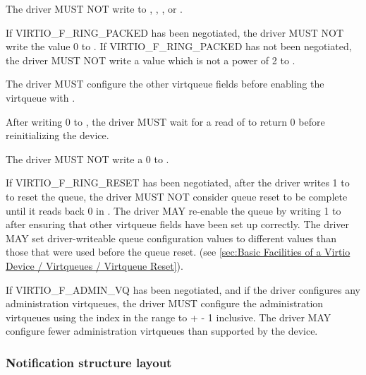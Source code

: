 
The driver MUST NOT write to , ,
,  or
.

If VIRTIO_F_RING_PACKED has been negotiated,
the driver MUST NOT write the value 0 to .
If VIRTIO_F_RING_PACKED has not been negotiated,
the driver MUST NOT write a value which is not a power of 2 to .

The driver MUST configure the other virtqueue fields before enabling the virtqueue
with .

After writing 0 to , the driver MUST wait for a read of
 to return 0 before reinitializing the device.

The driver MUST NOT write a 0 to .

If VIRTIO_F_RING_RESET has been negotiated, after the driver writes 1 to
 to reset the queue, the driver MUST NOT consider queue
reset to be complete until it reads back 0 in . The driver
MAY re-enable the queue by writing 1 to  after ensuring
that other virtqueue fields have been set up correctly. The driver MAY set
driver-writeable queue configuration values to different values than those that
were used before the queue reset.
(see \ref{sec:Basic Facilities of a Virtio Device / Virtqueues / Virtqueue Reset}).

If VIRTIO_F_ADMIN_VQ has been negotiated, and if the driver
configures any administration virtqueues, the driver MUST
configure the administration virtqueues using the index
in the range  to
 +  - 1 inclusive.
The driver MAY configure fewer administration virtqueues than
supported by the device.

\subsubsection{Notification structure layout}\label{sec:Virtio Transport Options / Virtio Over PCI Bus / PCI Device Layout / Notification capability}

